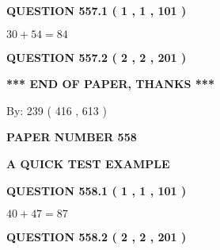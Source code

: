 \documentclass[12pt]{article}
\begin{document}
{\textbf{\Large{QUESTION
557.1 
 ( 1 , 1 , 101 )
}}}
  
  
 
 

$ %
30 +  %
54=   %
84$
 
 
  
\vspace{0.2in}
  
{\textbf{\Large{QUESTION
557.2 
 ( 2 , 2 , 201 )
}}}
  
  
   
   
 \vspace{0.2in}
 
   
   
   
   
\vspace{1.0in} 
{\textbf{\large{ *** END OF PAPER, THANKS *** }}} 
   
   
\hspace{1.0in} By: 
 239 ( 416 ,  613 )
   
   
   
   
\newpage 
\setcounter{page}{ 
   558001 } 
   
   
   
   
 {\textbf{ \Large{ PAPER NUMBER  558  }}}
   
   
\vspace{0.2in}
   
   
   
   
   
   
 \vspace{0.2in}
{\LARGE {\textbf{ A QUICK TEST EXAMPLE}}}
   
   
  
\vspace{0.2in}
  
{\textbf{\Large{QUESTION
558.1 
 ( 1 , 1 , 101 )
}}}
  
  
 
 

$ %
40 +  %
47=   %
87$
 
 
  
\vspace{0.2in}
  
{\textbf{\Large{QUESTION
558.2 
 ( 2 , 2 , 201 )
}}}
  
  
   
   
 \vspace{0.2in}
 
   
   
\end{document}

